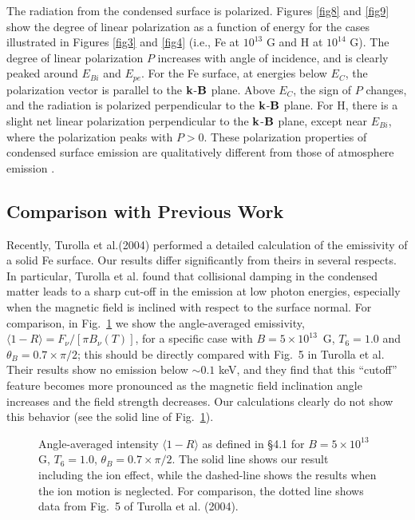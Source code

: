 \documentclass{emulateapj}
\newcommand{\bB}{{\bf B}}
\newcommand{\bk}{{\bf k}}
\begin{document}
The radiation from the condensed surface is polarized.  
Figures \ref{fig8} and \ref{fig9} show the degree
of linear polarization as a function of energy for the cases 
illustrated in Figures \ref{fig3} and \ref{fig4}
(i.e., Fe at $10^{13}$ G and H at $10^{14}$ G).  The degree of
linear polarization $P$ increases with angle of incidence, 
and is clearly peaked around $E_{Bi}$ and $E_{pe}$.  
For the Fe surface, at energies below $E_{C}$, 
the polarization vector is parallel to the $\bk$-$\bB$ plane. 
Above $E_{C}$, the sign of $P$ changes, and the radiation 
is polarized perpendicular to the $\bk$-$\bB$ plane. 
For H, there is a slight net linear polarization perpendicular 
to the $\bk$-$\bB$ plane, except near $E_{Bi}$, where the polarization
peaks with $P>0$. These polarization properties of
condensed surface emission are qualitatively different from
those of atmosphere emission
\citep[see][and references therein]{LaiHo03b}.

\subsection{Comparison with Previous Work}

Recently, Turolla et al.(2004) performed a detailed calculation of 
the emissivity of a solid Fe surface. Our results differ significantly 
from theirs in several respects. In particular, Turolla et al. 
found that collisional damping in the condensed matter leads to a sharp
cut-off in the emission at low photon energies, especially when the 
magnetic field is inclined with respect to the surface normal.
For comparison, in Fig.~\ref{fig10} we show the angle-averaged emissivity,
$\langle 1-R \rangle = F_\nu/[\pi B_\nu(T)]$,
for a specific case with $B=5\times 10^{13}$~G, $T_6=1.0$ and 
$\theta_B=0.7\times\pi/2$; this should be directly compared with Fig.~5
in Turolla et al. Their results show no emission below $\sim 0.1$ keV, and
they find that this ``cutoff'' feature becomes more pronounced 
as the magnetic field inclination angle increases and the field strength 
decreases. Our calculations clearly do not show this behavior (see the
solid line of Fig.~\ref{fig10}).

\begin{figure}
\caption{Angle-averaged intensity $\langle 1-R \rangle$ as defined in \S 4.1 
for $B=5\times 10^{13}$ G, $T_6=1.0$, 
$\theta_B=0.7\times\pi/2$. The solid line shows our result including the
ion effect, while the dashed-line shows the results when the ion motion
is neglected. For comparison, the dotted line shows data from Fig.~5
of Turolla et al. (2004).}
\label{fig10}
\end{figure}
\end{document}
